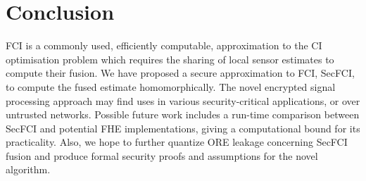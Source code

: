 \documentclass[letterpaper, 10 pt, conference]{ieeeconf}  %
\begin{document}



\section{Conclusion} \label{sec:conclusion}
FCI is a commonly used, efficiently computable, approximation to the CI optimisation problem which requires the sharing of local sensor estimates to compute their fusion. We have proposed a secure approximation to FCI, SecFCI, to compute the fused estimate homomorphically. The novel encrypted signal processing approach may find uses in various security-critical applications, or over untrusted networks. Possible future work includes a run-time comparison between SecFCI and potential FHE implementations, giving a computational bound for its practicality. Also, we hope to further quantize ORE leakage concerning SecFCI fusion and produce formal security proofs and assumptions for the novel algorithm.



\end{document}
